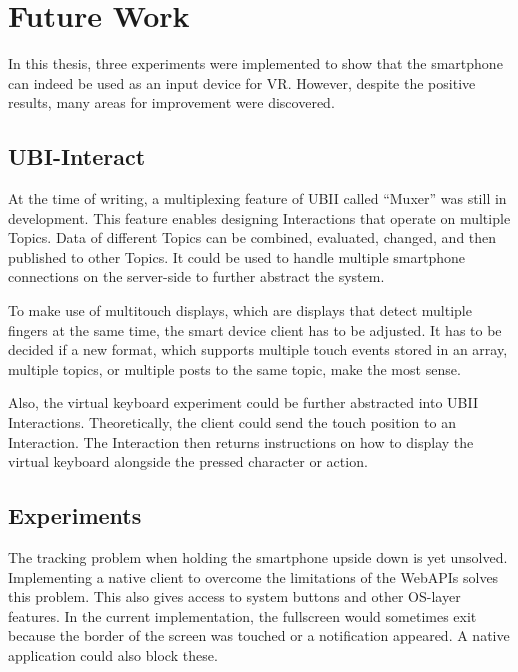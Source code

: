 \chapter{Future Work}\label{chapter:future-work}

In this thesis, three experiments were implemented to show that the smartphone can indeed be used as an input device for \gls{VR}. However, despite the positive results, many areas for improvement were discovered. %


\section{UBI-Interact}\label{section:fw-ubii}

At the time of writing, a multiplexing feature of \gls{UBII} called \enquote{Muxer} was still in development. This feature enables designing Interactions that operate on multiple Topics. Data of different Topics can be combined, evaluated, changed, and then published to other Topics. It could be used to handle multiple smartphone connections on the server-side to further abstract the system.

To make use of multitouch displays, which are displays that detect multiple fingers at the same time, the smart device client has to be adjusted. It has to be decided if a new format, which supports multiple touch events stored in an array, multiple topics, or multiple posts to the same topic, make the most sense.

Also, the virtual keyboard experiment could be further abstracted into \gls{UBII} Interactions. Theoretically, the client could send the touch position to an Interaction. The Interaction then returns instructions on how to display the virtual keyboard alongside the pressed character or action.


\section{Experiments}\label{section:fw-experiments}

The tracking problem when holding the smartphone upside down is yet unsolved. Implementing a native client to overcome the limitations of the Web\glspl{API} solves this problem. This also gives access to system buttons and other \gls{OS}-layer features. In the current implementation, the fullscreen would sometimes exit because the border of the screen was touched or a notification appeared. A native application could also block these.

